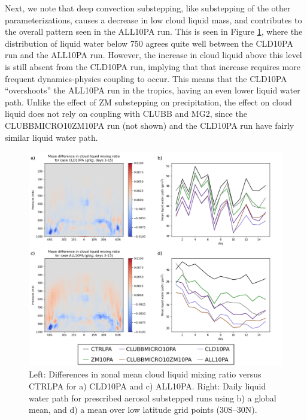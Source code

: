 \documentclass [11pt, proquest] {uwthesis}[2020/02/24]
\begin{document}
Next, we note that deep convection substepping, like substepping of the other parameterizations, causes a decrease in low cloud liquid mass, and contributes to the overall pattern seen in the ALL10PA run. This is seen in Figure \ref{fig:cldliq-pa}, where the distribution of liquid water below \SI{750}{\millibar} agrees quite well between the CLD10PA run and the ALL10PA run. However, the increase in cloud liquid above this level is still absent from the CLD10PA run, implying that that increase requires more frequent dynamics-physics coupling to occur. This means that the CLD10PA ``overshoots'' the ALL10PA run in the tropics, having an even lower liquid water path. Unlike the effect of ZM substepping on precipitation, the effect on cloud liquid does not rely on coupling with CLUBB and MG2, since the CLUBBMICRO10ZM10PA run (not shown) and the CLD10PA run have fairly similar liquid water path.

\begin{figure}
    \centering
    \includegraphics[width=6.5in]{Figure14.png}
    \caption[Comparison of cloud liquid mass between short prescribed-aerosol EAMv1 runs using different forms of substepping.]{Left: Differences in zonal mean cloud liquid mixing ratio versus CTRLPA for a) CLD10PA and c) ALL10PA. Right: Daily liquid water path for prescribed aerosol substepped runs using b) a global mean, and d) a mean over low latitude grid points (\num{30}S--\num{30}N).}
    \label{fig:cldliq-pa}
\end{figure}
\end{document}
